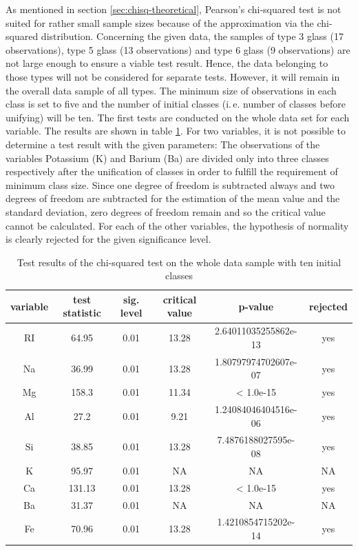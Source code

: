 \documentclass[a4paper, 12pt, titlepage, headsepline, listof = totoc, bibliography = totoc, numbers = noenddot]{scrartcl}
\newcommand{\ie}{i.\,e. }
\begin{document}
As mentioned in section \ref{sec:chisq-theoretical}, Pearson's chi-squared test is not suited for rather small sample sizes because of the approximation via the chi-squared distribution. Concerning the given data, the samples of type 3 glass (17 observations), type 5 glass (13 observations) and type 6 glass (9 observations) are not large enough to ensure a viable test result. Hence, the data belonging to those types will not be considered for separate tests. However, it will remain in the overall data sample of all types. The minimum size of observations in each class is set to five and the number of initial classes (\ie number of classes before unifying) will be ten. The first tests are conducted on the whole data set for each variable. The results are shown in table \ref{tab:chi-full}. For two variables, it is not possible to determine a test result with the given parameters: The observations of the variables Potassium (K) and Barium (Ba) are divided only into three classes respectively after the unification of classes in order to fulfill the requirement of minimum class size. Since one degree of freedom is subtracted always and two degrees of freedom are subtracted for the estimation of the mean value and the standard deviation, zero degrees of freedom remain and so the critical value cannot be calculated. For each of the other variables, the hypothesis of normality is clearly rejected for the given significance level.

\begin{table}[h!]
\centering
\begin{tabular}{|cccccc|} \hline variable & test statistic & sig. level & critical value & p-value & rejected\\ \hline RI & 64.95 & 0.01 & 13.28 & 2.64011035255862e-13 & yes\\ 
Na & 36.99 & 0.01 & 13.28 & 1.80797974702607e-07 & yes\\ 
Mg & 158.3 & 0.01 & 11.34 & < 1.0e-15 & yes\\ 
Al & 27.2 & 0.01 & 9.21 & 1.24084046404516e-06 & yes\\ 
Si & 38.85 & 0.01 & 13.28 & 7.4876188027595e-08 & yes\\ 
K & 95.97 & 0.01 & NA & NA & NA\\ 
Ca & 131.13 & 0.01 & 13.28 & < 1.0e-15 & yes\\ 
Ba & 31.37 & 0.01 & NA & NA & NA\\ 
Fe & 70.96 & 0.01 & 13.28 & 1.4210854715202e-14 & yes\\ \hline \end{tabular}\caption{Test results of the chi-squared test on the whole data sample with ten initial classes}
\label{tab:chi-full}
\end{table}
\end{document}

